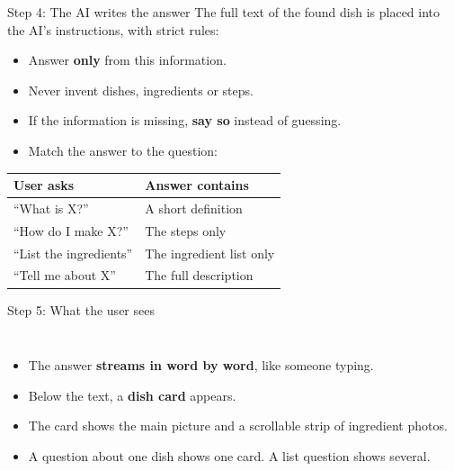 \documentclass[aspectratio=169,11pt]{beamer}
\newcommand{\key}[1]{\textcolor{ember}{\textbf{#1}}}
\begin{document}
\begin{frame}{Step 4: The AI writes the answer}
  The full text of the found dish is placed into the AI's instructions, with strict rules:
  \vspace{0.2cm}
  \begin{itemize}
    \item Answer \key{only} from this information.
    \item Never invent dishes, ingredients or steps.
    \item If the information is missing, \key{say so} instead of guessing.
    \item Match the answer to the question:
  \end{itemize}
  \vspace{0.1cm}
  \centering\small
  \begin{tabular}{@{}ll@{}}
    \toprule
    User asks & Answer contains \\
    \midrule
    ``What is X?'' & A short definition \\
    ``How do I make X?'' & The steps only \\
    ``List the ingredients'' & The ingredient list only \\
    ``Tell me about X'' & The full description \\
    \bottomrule
  \end{tabular}
\end{frame}

\begin{frame}{Step 5: What the user sees}
  \begin{columns}[T]
      \begin{itemize}
        \item The answer \key{streams in word by word}, like someone typing.
        \item Below the text, a \key{dish card} appears.
        \item The card shows the main picture and a scrollable strip of ingredient photos.
        \item A question about one dish shows one card. A list question shows several.
      \end{itemize}
      \centering
  \end{columns}
\end{frame}
\end{document}
